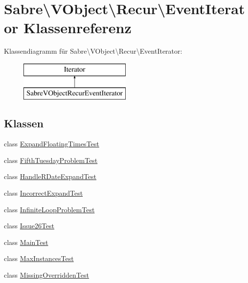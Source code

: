 \hypertarget{class_sabre_1_1_v_object_1_1_recur_1_1_event_iterator}{}\section{Sabre\textbackslash{}V\+Object\textbackslash{}Recur\textbackslash{}Event\+Iterator Klassenreferenz}
\label{class_sabre_1_1_v_object_1_1_recur_1_1_event_iterator}
Klassendiagramm für Sabre\textbackslash{}V\+Object\textbackslash{}Recur\textbackslash{}Event\+Iterator\+:\begin{figure}[H]
\begin{center}
\leavevmode
\includegraphics[height=2.000000cm]{class_sabre_1_1_v_object_1_1_recur_1_1_event_iterator}
\end{center}
\end{figure}
\subsection*{Klassen}
\begin{DoxyCompactItemize}
\item 
class \mbox{\hyperlink{class_sabre_1_1_v_object_1_1_recur_1_1_event_iterator_1_1_expand_floating_times_test}{Expand\+Floating\+Times\+Test}}
\item 
class \mbox{\hyperlink{class_sabre_1_1_v_object_1_1_recur_1_1_event_iterator_1_1_fifth_tuesday_problem_test}{Fifth\+Tuesday\+Problem\+Test}}
\item 
class \mbox{\hyperlink{class_sabre_1_1_v_object_1_1_recur_1_1_event_iterator_1_1_handle_r_date_expand_test}{Handle\+R\+Date\+Expand\+Test}}
\item 
class \mbox{\hyperlink{class_sabre_1_1_v_object_1_1_recur_1_1_event_iterator_1_1_incorrect_expand_test}{Incorrect\+Expand\+Test}}
\item 
class \mbox{\hyperlink{class_sabre_1_1_v_object_1_1_recur_1_1_event_iterator_1_1_infinite_loop_problem_test}{Infinite\+Loop\+Problem\+Test}}
\item 
class \mbox{\hyperlink{class_sabre_1_1_v_object_1_1_recur_1_1_event_iterator_1_1_issue26_test}{Issue26\+Test}}
\item 
class \mbox{\hyperlink{class_sabre_1_1_v_object_1_1_recur_1_1_event_iterator_1_1_main_test}{Main\+Test}}
\item 
class \mbox{\hyperlink{class_sabre_1_1_v_object_1_1_recur_1_1_event_iterator_1_1_max_instances_test}{Max\+Instances\+Test}}
\item 
class \mbox{\hyperlink{class_sabre_1_1_v_object_1_1_recur_1_1_event_iterator_1_1_missing_overridden_test}{Missing\+Overridden\+Test}}
\end{DoxyCompactItemize}
